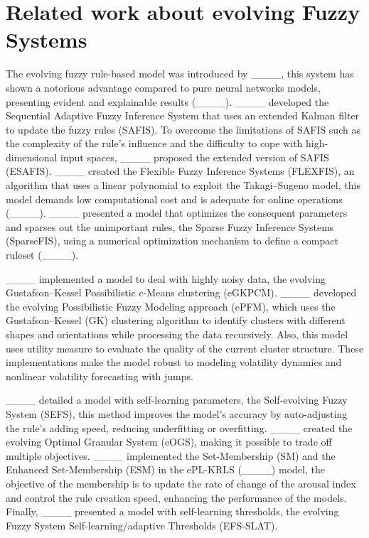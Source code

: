 \section{Related work about evolving Fuzzy Systems}
The evolving fuzzy rule-based model was introduced by ____, this system has shown a notorious advantage compared to pure neural networks models, presenting evident and explainable results (____). ____ developed the Sequential Adaptive Fuzzy Inference System that uses an extended Kalman filter to update the fuzzy rules (SAFIS). To overcome the limitations of SAFIS such as the complexity of the rule's influence and the difficulty to cope with high-dimensional input spaces, ____ proposed the extended version of SAFIS (ESAFIS). ____ created the Flexible Fuzzy Inference Systems (FLEXFIS), an algorithm that uses a linear polynomial to exploit the Takagi–Sugeno model, this model demands low computational cost and is adequate for online operations (____). ____ presented a model that optimizes the consequent parameters and sparses out the unimportant rules, the Sparse Fuzzy Inference Systems (SparseFIS), using a numerical optimization mechanism to define a compact ruleset (____).

____ implemented a model to deal with highly noisy data, the evolving Gustafson–Kessel Possibilistic c-Means clustering (eGKPCM). ____ developed the evolving Possibilistic Fuzzy Modeling approach (ePFM), which uses the Gustafson–Kessel (GK) clustering algorithm to identify clusters with different shapes and orientations while processing the data recursively. Also, this model uses utility measure to evaluate the quality of the current cluster structure. These implementations make the model robust to modeling volatility dynamics and nonlinear volatility forecasting with jumps.

____ detailed a model with self-learning parameters, the Self-evolving Fuzzy System (SEFS), this method improves the model’s accuracy by auto-adjusting the rule’s adding speed, reducing underfitting or overfitting. ____ created the evolving Optimal Granular System (eOGS), making it possible to trade off multiple objectives. ____ implemented the Set-Membership (SM) and the Enhanced Set-Membership (ESM) in the ePL-KRLS (____) model, the objective of the membership is to update the rate of change of the arousal index and control the rule creation speed, enhancing the performance of the models. Finally, ____ presented a model with self-learning thresholds, the evolving Fuzzy System Self-learning/adaptive Thresholds (EFS-SLAT). 

